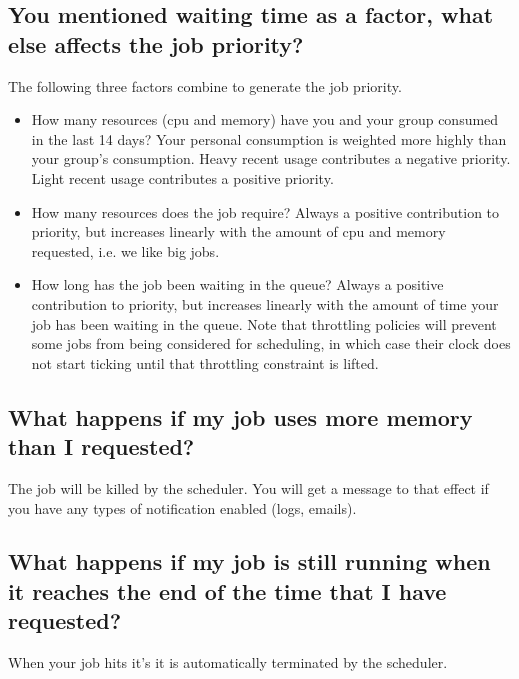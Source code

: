 \documentclass[letterpaper,10pt,english]{sphinxmanual}
\begin{document}
\subsection{You mentioned waiting time as a factor, what else affects the job priority?}
\label{\detokenize{faq:you-mentioned-waiting-time-as-a-factor-what-else-affects-the-job-priority}}
The following three factors combine to generate the job priority.
\begin{itemize}
\item {} 
How many resources (cpu and memory) have you and your group consumed in the last 14 days? Your personal consumption is weighted more highly than your group’s consumption. Heavy recent usage contributes a negative priority. Light recent usage contributes a positive priority.

\item {} 
How many resources does the job require? Always a positive contribution to priority, but increases linearly with the amount of cpu and memory requested, i.e. we like big jobs.

\item {} 
How long has the job been waiting in the queue? Always a positive contribution to priority, but increases linearly with the amount of time your job has been waiting in the queue. Note that throttling policies will prevent some jobs from being considered for scheduling, in which case their clock does not start ticking until that throttling constraint is lifted.

\end{itemize}


\subsection{What happens if my job uses more memory than I requested?}
\label{\detokenize{faq:what-happens-if-my-job-uses-more-memory-than-i-requested}}
The job will be killed by the scheduler. You will get a message to that effect if you have any types of notification enabled (logs, emails).


\subsection{What happens if my job is still running when it reaches the end of the time that I have requested?}
\label{\detokenize{faq:what-happens-if-my-job-is-still-running-when-it-reaches-the-end-of-the-time-that-i-have-requested}}
When your job hits it’s {\hyperref[\detokenize{glossary:term-Walltime}]{}} it is automatically terminated by the scheduler.
\end{document}
